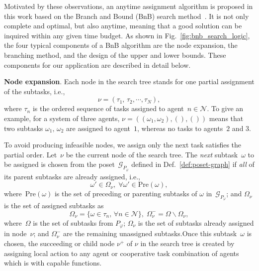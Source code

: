 Motivated by these observations, an anytime assignment
algorithm is proposed in this work based on the Branch and Bound (BnB) search
method~\citep{morrison2016branch}.
It is not only complete and optimal, but also anytime, meaning that a good
solution can be inquired within any given time budget.
As shown in Fig.~\ref{fig:bnb_search_logic},
the four typical components of a BnB
algorithm are the node expansion, the branching method,
and the design of the upper and lower bounds.
These components for our application are described in detail below.


\textbf{Node expansion}.
Each node in the search tree stands for one partial assignment of the
subtasks, i.e.,
\begin{equation}\label{eq:node}
\nu = (\tau_1,\,\tau_2,\cdots,\tau_N),
\end{equation}
where $\tau_n$ is the ordered sequence of tasks assigned to agent~$n\in \mathcal{N}$.
To give an example, for a system of three agents,
$\nu=((\omega_1,\omega_2),(),())$ means that two subtasks
$\omega_1,\, \omega_2$ are assigned to agent~$1$,
whereas no tasks to agents~$2$ and $3$.


To avoid producing infeasible nodes, we assign only the next task satisfies
the partial order. Let~$\nu$ be the current node of the search tree.
The \emph{next} subtask~$\omega$ to be assigned is chosen from the
poset~$\mathcal{G}_{P_\varphi}$ defined in Def.~\ref{def:poset-graph}
if \emph{all} of its parent subtasks are already assigned, i.e.,
\begin{equation}\label{eq:next-task}
\omega' \in \Omega_\nu, \; \forall \omega' \in \text{Pre}(\omega),
\end{equation}
where~$\text{Pre}(\omega)$ is the set of preceding or parenting subtasks of $\omega$ in~$\mathcal{G}_{P_\varphi}$;
and $\Omega_\nu$ is the set of assigned subtasks as
\begin{equation}\label{eq:node-tasks}
\Omega_{\nu}=\{\omega\in\tau_n,\,\forall n\in \mathcal{N}\},
\;\Omega^-_{\nu} = \Omega\backslash \Omega_{\nu},
\end{equation}
where~$\Omega$ is the set of subtasks from $P_\varphi$;
$\Omega_{\nu}$ is the set of subtasks already assigned in node~$\nu$;
and $\Omega^-_{\nu}$ are the remaining unassigned subtasks.Once this
subtask~$\omega$ is chosen, the succeeding or child node $\nu^+$
of $\nu$ in the search tree is created by assigning local action to any agent or
cooperative task combination of agents which is with capable functions.

